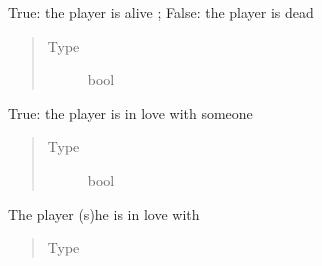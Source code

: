 \documentclass[letterpaper,10pt,english]{sphinxmanual}
\begin{document}
\begin{fulllineitems}
\begin{fulllineitems}
\begin{quote}
\begin{description}
\end{description}\end{quote}

\end{fulllineitems}


\begin{fulllineitems}
\label{\detokenize{chatwolf:chatwolf.player.Player.alive}}
True: the player is alive ; False: the player is dead
\begin{quote}\begin{description}
\item[{Type}] \leavevmode
bool

\end{description}\end{quote}

\end{fulllineitems}


\begin{fulllineitems}
\label{\detokenize{chatwolf:chatwolf.player.Player.love}}
True: the player is in love with someone
\begin{quote}\begin{description}
\item[{Type}] \leavevmode
bool

\end{description}\end{quote}

\end{fulllineitems}


\begin{fulllineitems}
\label{\detokenize{chatwolf:chatwolf.player.Player.lover}}
The player (s)he is in love with
\begin{quote}\begin{description}
\item[{Type}] \leavevmode
{\hyperref[\detokenize{chatwolf:chatwolf.player.Player}]{}}


\end{description}
\end{quote}
\end{fulllineitems}
\end{fulllineitems}
\end{document}
